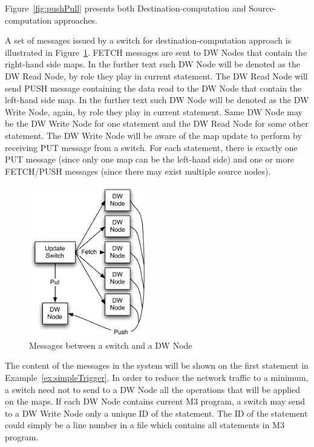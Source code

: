 \documentclass{sig-semester}
\def\M3{M3\xspace}
\begin{document}
Figure~\ref{fig:pushPull} presents both Destination-computation and Source-computation approaches.

A set of messages issued by a switch for destination-computation approach is illustrated in Figure~\ref{fig:msgs}. FETCH messages are sent to DW Nodes that contain the right-hand side maps. In the further text such DW Node will be denoted as the DW Read Node, by role they play in current statement. The DW Read Node will send PUSH message containing the data read to the DW Node that contain the left-hand side map. In the further text such DW Node will be denoted as the DW Write Node, again, by role they play in current statement. Same DW Node may be the DW Write Node for one statement and the DW Read Node for some other statement. The DW Write Node will be aware of the map update to perform by receiving PUT message from a switch. For each statement, there is exactly one PUT message (since only one map can be the left-hand side) and one or more FETCH/PUSH messages (since there may exist multiple source nodes).

\begin{figure}
\begin{center}
\includegraphics[width=2in]{UpdateStep.pdf}
\vspace{-3mm}
\caption{Messages between a switch and a DW Node}
\label{fig:msgs}
\vspace{-2mm}
\end{center}
\end{figure}

The content of the messages in the system will be shown on the first statement in Example~\ref{ex:simpleTrigger}. In order to reduce the network traffic to a minimum, a switch need not to send to a DW Node all the operations that will be applied on the maps. If each DW Node contains current \M3 program, a switch may send to a DW Write Node only a unique ID of the statement. The ID of the statement could simply be a line number in a file which contains all statements in \M3 program.
\end{document}
